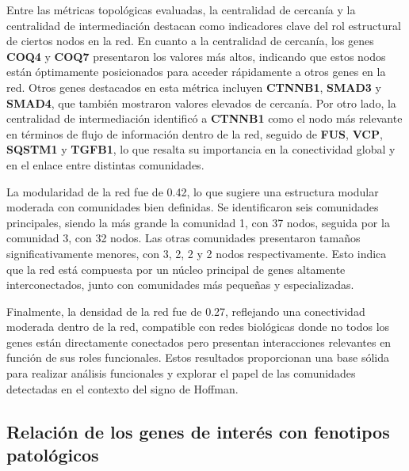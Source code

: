 Entre las métricas topológicas evaluadas, la centralidad de cercanía y la centralidad de intermediación destacan como indicadores clave del rol estructural de ciertos nodos en la red. En cuanto a la centralidad de cercanía, los genes \textbf{COQ4} y \textbf{COQ7} presentaron los valores más altos, indicando que estos nodos están óptimamente posicionados para acceder rápidamente a otros genes en la red. Otros genes destacados en esta métrica incluyen \textbf{CTNNB1}, \textbf{SMAD3} y \textbf{SMAD4}, que también mostraron valores elevados de cercanía. Por otro lado, la centralidad de intermediación identificó a \textbf{CTNNB1} como el nodo más relevante en términos de flujo de información dentro de la red, seguido de \textbf{FUS}, \textbf{VCP}, \textbf{SQSTM1} y \textbf{TGFB1}, lo que resalta su importancia en la conectividad global y en el enlace entre distintas comunidades.

La modularidad de la red fue de 0.42, lo que sugiere una estructura modular moderada con comunidades bien definidas. Se identificaron seis comunidades principales, siendo la más grande la comunidad 1, con 37 nodos, seguida por la comunidad 3, con 32 nodos. Las otras comunidades presentaron tamaños significativamente menores, con 3, 2, 2 y 2 nodos respectivamente. Esto indica que la red está compuesta por un núcleo principal de genes altamente interconectados, junto con comunidades más pequeñas y especializadas.

Finalmente, la densidad de la red fue de 0.27, reflejando una conectividad moderada dentro de la red, compatible con redes biológicas donde no todos los genes están directamente conectados pero presentan interacciones relevantes en función de sus roles funcionales. Estos resultados proporcionan una base sólida para realizar análisis funcionales y explorar el papel de las comunidades detectadas en el contexto del signo de Hoffman.




\subsection{Relación de los genes de interés con fenotipos patológicos}
